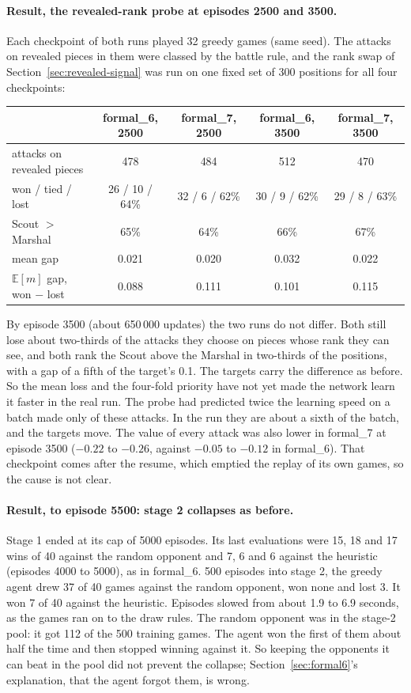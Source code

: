 \paragraph{Result, the revealed-rank probe at episodes 2500 and 3500.} Each checkpoint of both
runs played 32 greedy games (same seed). The attacks on revealed pieces in them were classed by
the battle rule, and the rank swap of Section~\ref{sec:revealed-signal} was run on one fixed set
of 300 positions for all four checkpoints:
\begin{center}
\small
\begin{tabular}{lcccc}
\toprule
 & formal\_6, 2500 & formal\_7, 2500 & formal\_6, 3500 & formal\_7, 3500 \\
\midrule
attacks on revealed pieces & 478 & 484 & 512 & 470 \\
\quad won / tied / lost & 26 / 10 / 64\% & 32 / 6 / 62\% & 30 / 9 / 62\% & 29 / 8 / 63\% \\
Scout $>$ Marshal & 65\% & 64\% & 66\% & 67\% \\
mean gap & 0.021 & 0.020 & 0.032 & 0.022 \\
$\mathbb{E}[m]$ gap, won $-$ lost & 0.088 & 0.111 & 0.101 & 0.115 \\
\bottomrule
\end{tabular}
\end{center}
By episode 3500 (about 650\,000 updates) the two runs do not differ. Both still lose about
two-thirds of the attacks they choose on pieces whose rank they can see, and both rank the Scout
above the Marshal in two-thirds of the positions, with a gap of a fifth of the target's 0.1. The
targets carry the difference as before. So the mean loss and the four-fold priority have not yet
made the network learn it faster in the real run. The probe had predicted twice the learning
speed on a batch made only of these attacks. In the run they are about a sixth of the batch,
and the targets move. The value of every attack was also lower in formal\_7 at episode 3500
($-0.22$ to $-0.26$, against $-0.05$ to $-0.12$ in formal\_6). That checkpoint comes after the
resume, which emptied the replay of its own games, so the cause is not clear.

\paragraph{Result, to episode 5500: stage 2 collapses as before.} Stage 1 ended at its cap of
5000 episodes. Its last evaluations were 15, 18 and 17 wins of 40 against the random opponent
and 7, 6 and 6 against the heuristic (episodes 4000 to 5000), as in formal\_6. 500 episodes into
stage 2, the greedy agent drew 37 of 40 games against the random opponent, won none and lost 3.
It won 7 of 40 against the heuristic. Episodes slowed from about 1.9 to 6.9 seconds, as the
games ran on to the draw rules. The random opponent was in the stage-2 pool: it got 112 of the
500 training games. The agent won the first of them about half the time and then stopped winning
against it. So keeping the opponents it can beat in the pool did not prevent the collapse;
Section~\ref{sec:formal6}'s explanation, that the agent forgot them, is wrong.

